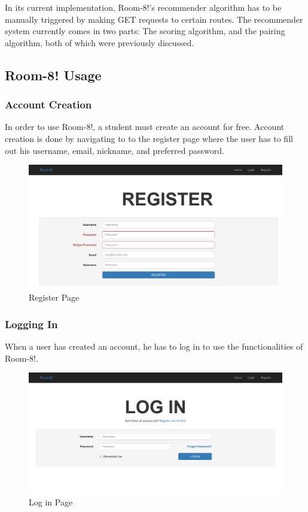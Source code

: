 \documentclass[journal]{IEEEtran}
\begin{document}
In its current implementation, Room-8!'s recommender algorithm has to be manually triggered by making GET requests to
certain routes. The recommender system currently comes in two parts: The scoring algorithm, and the pairing algorithm,
both of which were previously discussed.

    \subsection{Room-8! Usage}
        \subsubsection{Account Creation}
        In order to use Room-8!, a student must create an account for free. Account creation is done by navigating to
        to the register page where the user has to fill out his username, email, nickname, and preferred password.
        \begin{figure}
                \includegraphics[scale=0.5]{register.png}
                \caption{Register Page}
                \label{Registration Page}
        \end{figure}
        \subsubsection{Logging In}
        When a user has created an account, he has to log in to use the functionalities of Room-8!.
        \begin{figure}
                \includegraphics[scale=0.5]{login.png}
                \caption{Log in Page}
                \label{Log in Page}
        \end{figure}
\end{document}
